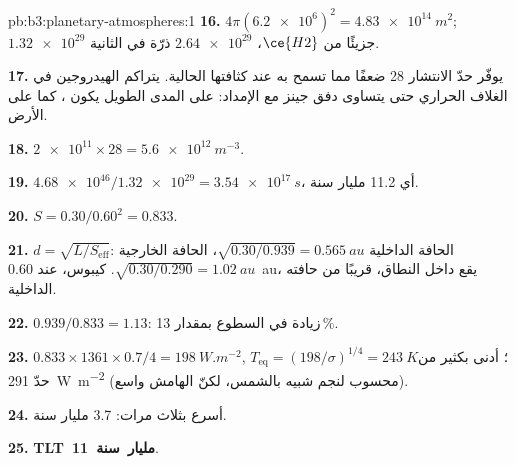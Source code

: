 \begin{solution}{pb:b3:planetary-atmospheres:1}
\textbf{16.} $4\pi(\num{6.2e6})^2 = \qty{4.83e14}{m^2}$; $\num{1.32e29}$ جزيئًا
من $\ce{H2}$، $\num{2.64e29}$ ذرّة في الثانية.

\textbf{17.} يوفّر حدّ الانتشار 28 ضعفًا مما تسمح به  عند
كثافتها الحالية. يتراكم الهيدروجين في الغلاف الحراري حتى
يتساوى دفق جينز مع الإمداد: على المدى الطويل يكون ، كما على الأرض.

\textbf{18.} $\num{2e11}\times28 = \qty{5.6e12}{m^{-3}}$.

\textbf{19.} $\num{4.68e46}/\num{1.32e29} = \qty{3.54e17}{s}$، أي 11.2 مليار سنة.

\textbf{20.} $S = 0.30/0.60^2 = 0.833$.

\textbf{21.} $d = \sqrt{L/S_\mathrm{eff}}$: الحافة الداخلية $\sqrt{0.30/0.939} =
\qty{0.565}{au}$، الحافة الخارجية $\sqrt{0.30/0.290} = \qty{1.02}{au}$. كيبوس،
عند \qty{0.60}{au}، يقع داخل النطاق، قريبًا من حافته الداخلية.

\textbf{22.} $0.939/0.833 = 1.13$: زيادة في السطوع بمقدار 13\,\%.

\textbf{23.} $0.833\times1361\times0.7/4 = \qty{198}{W.m^{-2}}$, $T_\mathrm{eq} =
(198/\sigma)^{1/4} = \qty{243}{K}$؛ أدنى بكثير من
حدّ \qty{291}{W.m^{-2}} (محسوب لنجم شبيه بالشمس، لكنّ الهامش
واسع).

\textbf{24.} أسرع بثلاث مرات: 3.7 مليار سنة.

\textbf{25.} \textbf{\mbox{\textdir TLT 11}~مليار~سنة}.
\end{solution}
